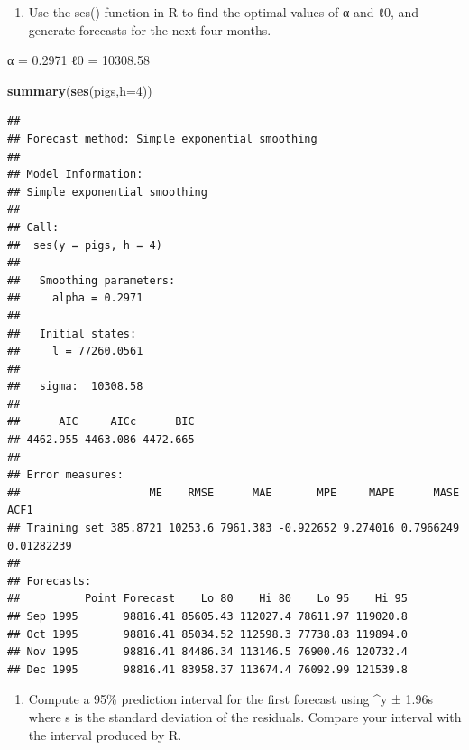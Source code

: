 \documentclass[]{article}
\newenvironment{Shaded}{\begin{snugshade}}{\end{snugshade}}
\newcommand{\KeywordTok}[1]{\textcolor[rgb]{0.13,0.29,0.53}{\textbf{#1}}}
\newcommand{\DataTypeTok}[1]{\textcolor[rgb]{0.13,0.29,0.53}{#1}}
\newcommand{\DecValTok}[1]{\textcolor[rgb]{0.00,0.00,0.81}{#1}}
\newcommand{\OperatorTok}[1]{\textcolor[rgb]{0.81,0.36,0.00}{\textbf{#1}}}
\newcommand{\NormalTok}[1]{#1}
\providecommand{\tightlist}{%
  \setlength{\itemsep}{0pt}\setlength{\parskip}{0pt}}
\begin{document}
\begin{enumerate}
\def\labelenumi{\alph{enumi})}
\tightlist
\item
  Use the ses() function in R to find the optimal values of α and ℓ0,
  and generate forecasts for the next four months.
\end{enumerate}

α = 0.2971 ℓ0 = 10308.58

\begin{Shaded}
\begin{Highlighting}[]
\KeywordTok{summary}\NormalTok{(}\KeywordTok{ses}\NormalTok{(pigs,}\DataTypeTok{h=}\DecValTok{4}\NormalTok{))}
\end{Highlighting}
\end{Shaded}

\begin{verbatim}
## 
## Forecast method: Simple exponential smoothing
## 
## Model Information:
## Simple exponential smoothing 
## 
## Call:
##  ses(y = pigs, h = 4) 
## 
##   Smoothing parameters:
##     alpha = 0.2971 
## 
##   Initial states:
##     l = 77260.0561 
## 
##   sigma:  10308.58
## 
##      AIC     AICc      BIC 
## 4462.955 4463.086 4472.665 
## 
## Error measures:
##                    ME    RMSE      MAE       MPE     MAPE      MASE       ACF1
## Training set 385.8721 10253.6 7961.383 -0.922652 9.274016 0.7966249 0.01282239
## 
## Forecasts:
##          Point Forecast    Lo 80    Hi 80    Lo 95    Hi 95
## Sep 1995       98816.41 85605.43 112027.4 78611.97 119020.8
## Oct 1995       98816.41 85034.52 112598.3 77738.83 119894.0
## Nov 1995       98816.41 84486.34 113146.5 76900.46 120732.4
## Dec 1995       98816.41 83958.37 113674.4 76092.99 121539.8
\end{verbatim}

\begin{enumerate}
\def\labelenumi{\alph{enumi})}
\setcounter{enumi}{1}
\tightlist
\item
  Compute a 95\% prediction interval for the first forecast using \^{}y
  ± 1.96s where s is the standard deviation of the residuals. Compare
  your interval with the interval produced by R.
\end{enumerate}

\begin{Shaded}
\end{Shaded}
\end{document}
